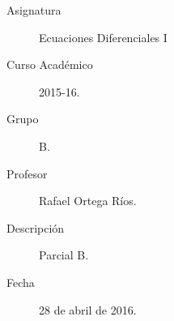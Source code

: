 \documentclass[12pt]{article}
\begin{document}

    
    

    \begin{description}
        \item[Asignatura] Ecuaciones Diferenciales I
        \item[Curso Académico] 2015-16.
        \item[Grupo] B.
        \item[Profesor] Rafael Ortega Ríos.
        \item[Descripción] Parcial B.
        \item[Fecha] 28 de abril de 2016.
    
    \end{description}
    \newpage
\end{document}
